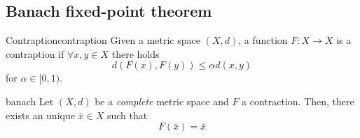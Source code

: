 \documentclass[12pt]{extarticle}
\numberwithin{equation}{section}
\begin{document}
\subsection{Banach fixed-point theorem}

\begin{definition}{Contraption}{contraption}
	Given a metric space $(X, d)$, a function $F: X \to X$ is a contraption if
	$\forall x, y \in X$ there holds
	\begin{equation}
		d(F(x), F(y)) \leq \alpha d(x, y)
	\end{equation}
	for $\alpha \in [0, 1)$.
\end{definition}

\begin{theorem}{}{banach}
	Let $(X, d)$ be a \emph{complete} metric space and $F$ a contraction.
	Then, there exists an unique $\bar x \in X$ such that
	\begin{equation}
		F(\bar x) = \bar x
	\end{equation}
\end{theorem}
\end{document}
